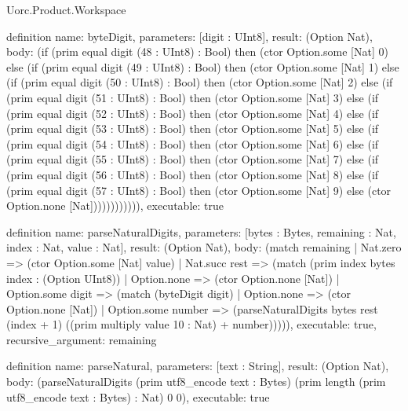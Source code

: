 \begin{lexlean}{Uorc.Product.Workspace}
\begin{semanticmodule}
definition{
  name: byteDigit,
  parameters: [digit : UInt8],
  result: (Option Nat),
  body: (if (prim equal digit (48 : UInt8) : Bool) then (ctor Option.some [Nat] 0) else (if (prim equal digit (49 : UInt8) : Bool) then (ctor Option.some [Nat] 1) else (if (prim equal digit (50 : UInt8) : Bool) then (ctor Option.some [Nat] 2) else (if (prim equal digit (51 : UInt8) : Bool) then (ctor Option.some [Nat] 3) else (if (prim equal digit (52 : UInt8) : Bool) then (ctor Option.some [Nat] 4) else (if (prim equal digit (53 : UInt8) : Bool) then (ctor Option.some [Nat] 5) else (if (prim equal digit (54 : UInt8) : Bool) then (ctor Option.some [Nat] 6) else (if (prim equal digit (55 : UInt8) : Bool) then (ctor Option.some [Nat] 7) else (if (prim equal digit (56 : UInt8) : Bool) then (ctor Option.some [Nat] 8) else (if (prim equal digit (57 : UInt8) : Bool) then (ctor Option.some [Nat] 9) else (ctor Option.none [Nat]))))))))))),
  executable: true
}

definition{
  name: parseNaturalDigits,
  parameters: [bytes : Bytes, remaining : Nat, index : Nat, value : Nat],
  result: (Option Nat),
  body: (match remaining
    | Nat.zero => (ctor Option.some [Nat] value)
    | Nat.succ rest => (match (prim index bytes index : (Option UInt8))
      | Option.none => (ctor Option.none [Nat])
      | Option.some digit => (match (byteDigit digit)
        | Option.none => (ctor Option.none [Nat])
        | Option.some number => (parseNaturalDigits bytes rest (index + 1) ((prim multiply value 10 : Nat) + number))))),
  executable: true,
  recursive_argument: remaining
}

definition{
  name: parseNatural,
  parameters: [text : String],
  result: (Option Nat),
  body: (parseNaturalDigits (prim utf8_encode text : Bytes) (prim length (prim utf8_encode text : Bytes) : Nat) 0 0),
  executable: true
}


\end{semanticmodule}
\end{lexlean}
